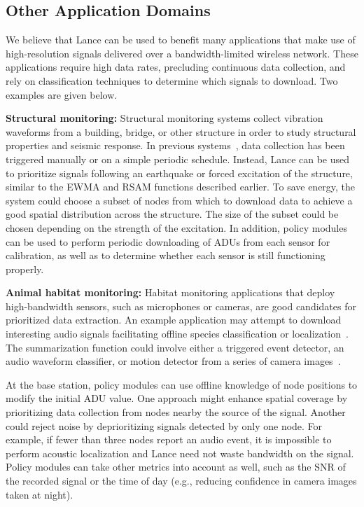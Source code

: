 \subsection{Other Application Domains}

We believe that Lance can be used to benefit many applications that make use
of high-resolution signals delivered over a bandwidth-limited wireless
network. These applications require high data rates, precluding continuous
data collection, and rely on classification techniques to determine which
signals to download. Two examples are given below.

{\bf Structural monitoring:}
Structural monitoring systems collect vibration
waveforms from a building, bridge, or other structure in order to
study structural properties and seismic response.
In previous systems~\cite{netshm-emnets05,ggb-ipsn07}, data collection
has been triggered manually or on a simple periodic schedule. Instead,
Lance can be used to prioritize signals following an earthquake or 
forced excitation of the structure, similar to the EWMA and RSAM
functions described earlier. To save energy, the system could choose a
subset of nodes from which to download data to achieve a good spatial
distribution across the structure. The size of the subset could be
chosen depending on the strength of the excitation. In addition, 
policy modules can be used to perform periodic downloading of ADUs 
from each sensor for calibration, as well as to determine whether 
each sensor is still functioning properly.

{\bf Animal habitat monitoring:}
Habitat monitoring applications that deploy high-bandwidth sensors, such as
microphones or cameras, are good candidates for prioritized data extraction. 
An example application may attempt to download interesting audio signals
facilitating offline species classification or 
localization~\cite{girod-ipsn07}. The summarization function could
involve either a triggered event detector, an audio waveform
classifier, or motion detector from a series of camera images~\cite{cyclops}.

At the base station, policy modules can use offline knowledge of node
positions to modify the initial ADU value. One approach might enhance
spatial coverage by prioritizing data collection from nodes nearby the
source of the signal. Another could reject noise by deprioritizing signals
detected by only one node. For example, if fewer than three nodes
report an audio event, it is impossible to perform acoustic
localization and Lance need not waste bandwidth on the signal.
Policy modules can take other metrics into account as well, 
such as the SNR of the recorded signal or the time of day (e.g.,
reducing confidence in camera images taken at night).

